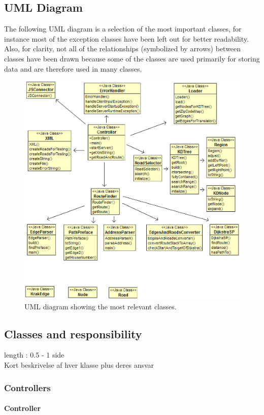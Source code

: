 \documentclass[a4paper,10pt,titlepage]{article}
\begin{document}
		\subsection{UML Diagram}
		The following UML diagram is a selection of the most important classes, for instance most of the exception classes have been left out for better readability. Also, for clarity, not all of the relationships (symbolized by arrows) between classes have been drawn because some of the classes are used primarily for storing data and are therefore used in many classes. 
		\begin{figure}[H]
\includegraphics[width=120mm]{umlArrows.png}
\caption{UML diagram showing the most relevant classes.}
\label{fig:uml}
\end{figure}
		
		\newpage
		\subsection{Classes and responsibility}
			length : 0.5 - 1 side\\
			Kort beskrivelse af hver klasse plus deres ansvar\\
			
			\subsubsection{Controllers}
			
				\paragraph{Controller}\mbox{}\
				
\end{document}
